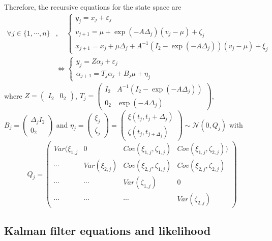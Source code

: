 \documentclass[11pt]{article}
\newcommand {\1}{\mathbb{1}}
\begin{document}
Therefore, the recursive equations for the state space are
\begin{align*}
	\forall j \in \{1, \cdots, n\}&, \quad 
	\left\{ \begin{array}{l}
		y_j=x_j+\varepsilon_j \\
		v_{j+1}=\mu +\exp(-A\Delta_j)(v_j-\mu)+\zeta_j \\
		x_{j+1}=x_j+\mu \Delta_j+A^{-1}(I_2-\exp(-A\Delta_j))(v_j-\mu)+\xi_j
	\end{array}\right. \\
	&\Leftrightarrow \left\{ \begin{array}{l}
		y_j=Z\alpha_j+\varepsilon_j \\
		\alpha_{j+1}=T_j \alpha_j+B_j \mu + \eta_j
	\end{array}\right.
\end{align*}
where $Z=\begin{pmatrix} I_2 & 0_2 \end{pmatrix}$, $T_j=\begin{pmatrix} I_2 & A^{-1}(I_2-\exp(-A\Delta_j)) \\
	0_2 & \exp(-A\Delta_j) \end{pmatrix}$, $B_j=\begin{pmatrix}
	\Delta_j I_2 \\
	0_2 \end{pmatrix}$ and $\eta_j=\begin{pmatrix} \xi_j \\ \zeta_j\end{pmatrix}=\begin{pmatrix} \xi(t_j,t_j+\Delta_j) \\ \zeta(t_j,t_{j+\Delta_j})\end{pmatrix} \sim \mathcal{N}(0,Q_j)$ with 
\[Q_j=\begin{pmatrix} 
	Var(\xi_{1,j} & 0 & Cov(\xi_{1,j},\zeta_{1,j}) & Cov(\xi_{1,j},\zeta_{2,j})) \\
	\cdots & Var(\xi_{2,j}) & Cov(\xi_{2,j}, \zeta_{1,j}) & Cov(\xi_{2,j},\zeta_{2,j}) \\
	\cdots & \cdots & Var(\zeta_{1,j}) & 0 \\
	\cdots & \cdots & \cdots & Var(\zeta_{2,j}) 
\end{pmatrix}\] 



\subsection{Kalman filter equations and likelihood}
\end{document}
